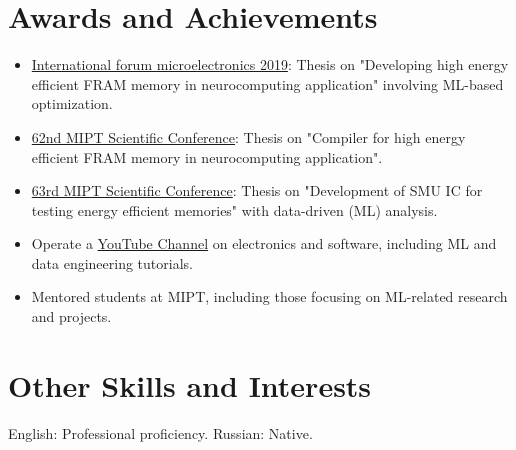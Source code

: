 \documentclass{article}
\begin{document}
\section{Awards and Achievements}
\begin{itemize}
\item \href{https://microelectronica.pro/}{International forum microelectronics 2019}: Thesis on "Developing high energy efficient FRAM memory in neurocomputing application" involving ML-based optimization.
\item  \href{https://conf62.mipt.ru/}{62nd MIPT Scientific Conference}: Thesis on "Compiler for high energy efficient FRAM memory in neurocomputing application".
\item \href{https://mipt.ru/science/5top100/education/courseproposal/%D0%A4%D0%AD%D0%A4%D0%9C.pdf}{63rd MIPT Scientific Conference}: Thesis on "Development of SMU IC for testing energy efficient memories" with data-driven (ML) analysis.
\item Operate a \href{https://www.youtube.com/channel/UCAjmXQnYQjWoVHx6NIo24CQ}{YouTube Channel} on electronics and software, including ML and data engineering tutorials.
\item Mentored students at MIPT, including those focusing on ML-related research and projects.
\end{itemize}

\section{Other Skills and Interests}
\begin{description}[widest=Languages]
\item[Languages] English: Professional proficiency. Russian: Native.
\end{description}
 
\end{document}
